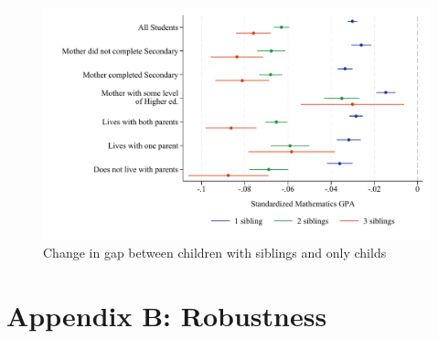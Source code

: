 \begin{figure}[htbp]
    \centering
    
        \includegraphics[width=\textwidth]{./FIGURES/TWFE/covid_twfe_D_bysibs_elm_all_gpa_m_adj_Tsiblings_Soldest_4.pdf}
        \caption{Change in gap between children with siblings and only childs}
        \label{fig:fig_appD}

\end{figure}





\newpage















\clearpage

\setcounter{figure}{0}
\renewcommand\thefigure{B.\arabic{figure}}    

\setcounter{table}{0}
\renewcommand{\thetable}{B.\arabic{table}}
\setcounter{subsection}{0}

\section*{Appendix B: Robustness} \label{sec:appB}

